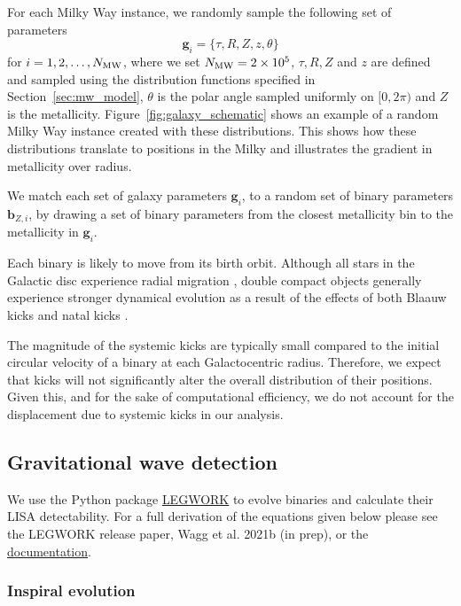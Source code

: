 For each Milky Way instance, we randomly sample the following set of parameters
\begin{equation}
    \mathbf{g}_{{i}} = \{\tau, R, Z, z, \theta\}
\end{equation}
for $i = 1, 2, \dots, N_{\rm MW}$, where we set $N_{\rm MW} = 2 \times 10^{5}$, $\tau, R, Z$ and $z$ are defined and sampled using the distribution functions specified in Section~\ref{sec:mw_model}, $\theta$ is the polar angle sampled uniformly on $[0, 2\pi)$ and $Z$ is the metallicity. Figure~\ref{fig:galaxy_schematic} shows an example of a random Milky Way instance created with these distributions. This shows how these distributions translate to positions in the Milky and illustrates the gradient in metallicity over radius.

We match each set of galaxy parameters $\mathbf{g}_{{i}}$, to a random set of binary parameters $\mathbf{b}_{{Z, i}}$, by drawing a set of binary parameters from the closest metallicity bin to the metallicity in $\mathbf{g}_{{i}}$.

Each binary is likely to move from its birth orbit. Although all stars in the Galactic disc experience radial migration \citep{Sellwood+2002, Frankel+2018}, double compact objects generally experience stronger dynamical evolution as a result of the effects of both Blaauw kicks \citep{Blaauw+1961} and natal kicks \citep[e.g.][]{Hobbs+2005}.

The magnitude of the systemic kicks are typically small compared to the initial circular velocity of a binary at each Galactocentric radius. Therefore, we expect that kicks will not significantly alter the overall distribution of their positions. Given this, and for the sake of computational efficiency, we do not account for the displacement due to systemic kicks in our analysis.

\subsection{Gravitational wave detection}\label{sec:gw_detection}
We use the Python package \href{https://legwork.readthedocs.io/en/latest/}{LEGWORK} to evolve binaries and calculate their LISA detectability. For a full derivation of the equations given below please see the LEGWORK release paper, Wagg et al. 2021b (in prep), or the \href{https://legwork.readthedocs.io/en/latest/notebooks/Derivations.html}{documentation}.

\subsubsection{Inspiral evolution}

